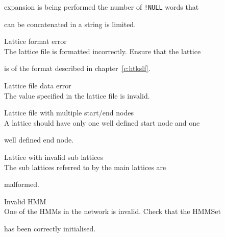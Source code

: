 \begin{itemize}
\begin{itemize}
        expansion is being performed the number of \texttt{!NULL} words that 


        can be concatenated in a string is limited.





    Lattice format error\\


        The lattice file is formatted incorrectly.  Ensure that the lattice


        is of the format described in chapter~\ref{c:htkslf}.





    Lattice file data error\\


        The value specified in the lattice file is invalid.





    Lattice file with multiple start/end nodes\\


        A lattice should have only one well defined start node and one


        well defined end node.





    Lattice with invalid sub lattices\\


        The sub lattices referred to by the main lattices are


        malformed.





\end{itemize}













\begin{itemize}


 Invalid HMM\\


        One of the HMMs in the network is invalid.  Check that the HMMSet


        has been correctly initialised.






\end{itemize}
\end{itemize}

